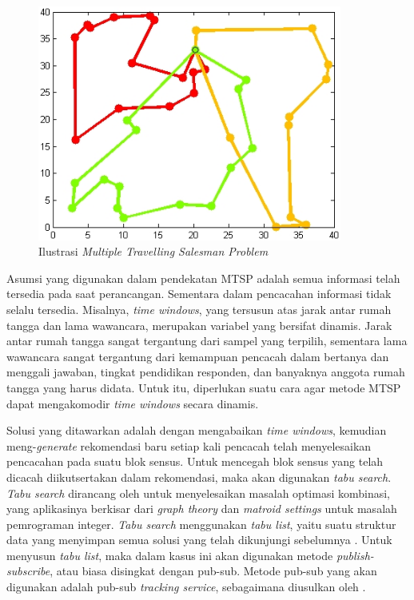 \begin{figure}[h]
    \centering
    \includegraphics[width=10cm]{../../Resources/Images/mtsp}
    \caption{Ilustrasi \textit{Multiple Travelling Salesman Problem}}
    \label{fig:mtsp-ilustration}
\end{figure}


Asumsi yang digunakan dalam pendekatan MTSP adalah semua informasi telah tersedia pada saat perancangan. Sementara dalam pencacahan informasi tidak selalu tersedia. Misalnya, \textit{time windows}, yang tersusun atas jarak antar rumah tangga dan lama wawancara, merupakan variabel yang bersifat dinamis. Jarak antar rumah tangga sangat tergantung dari sampel yang terpilih, sementara lama wawancara sangat tergantung dari kemampuan pencacah dalam bertanya dan menggali jawaban, tingkat pendidikan responden, dan banyaknya anggota rumah tangga yang harus didata. Untuk itu, diperlukan suatu cara agar metode MTSP dapat mengakomodir \textit{time windows} secara dinamis.


Solusi yang ditawarkan adalah dengan mengabaikan \textit{time windows}, kemudian meng-\textit{generate} rekomendasi baru setiap kali pencacah telah menyelesaikan pencacahan pada suatu blok sensus. Untuk mencegah blok sensus yang telah dicacah diikutsertakan dalam rekomendasi, maka akan digunakan \textit{tabu search}. \textit{Tabu search} dirancang oleh \citep{glover_tabu_1989, glover_tabu_1990} untuk menyelesaikan masalah optimasi kombinasi, yang aplikasinya berkisar dari \textit{graph theory} dan \textit{matroid settings} untuk masalah pemrograman integer. \textit{Tabu search} menggunakan \textit{tabu list}, yaitu suatu struktur data yang menyimpan semua solusi yang telah dikunjungi sebelumnya \citep{orourke_dynamic_1999}. Untuk menyusun \textit{tabu list}, maka dalam kasus ini akan digunakan metode \textit{publish-subscribe}, atau biasa disingkat dengan pub-sub. Metode pub-sub yang akan digunakan adalah pub-sub \textit{tracking service}, sebagaimana diusulkan oleh \citep{chen_efficient_2003}.


